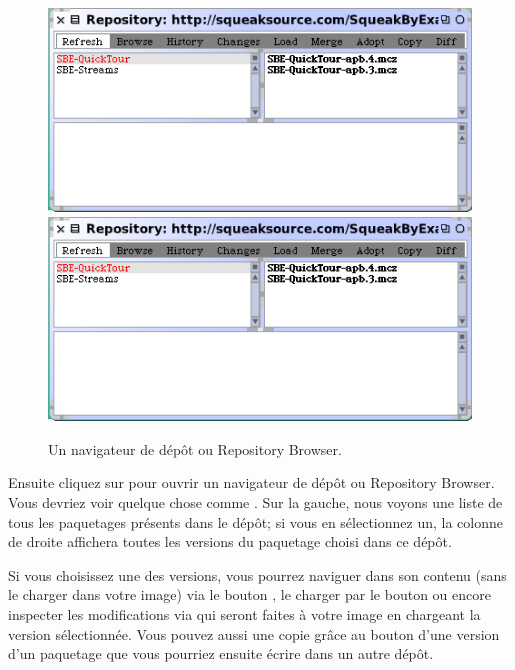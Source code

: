 \documentclass[a4paper,10pt,twoside]{book}
\begin{document}
\begin{figure}[btp]
	\begin{center}
	\ifluluelse
		{\includegraphics[width=\textwidth]{SqueakSource-SBE}}
		{\includegraphics[scale=0.7]{SqueakSource-SBE}}
	\end{center}
	\caption{Un navigateur de d\'ep\^ot ou Repository Browser.}
	\label{fig:SqueakSource:SBE}
\end{figure}
\noindent

Ensuite cliquez sur  pour ouvrir un navigateur de d\'ep\^ot ou
Repository Browser. Vous devriez voir quelque chose comme
 .  
Sur la gauche, nous voyons une liste de tous les paquetages pr\'esents dans le
d\'ep\^ot; si vous en s\'electionnez un, la colonne de droite affichera
toutes les versions du paquetage choisi dans ce d\'ep\^ot.

Si vous choisissez une des versions, vous pourrez naviguer dans son contenu (sans le charger dans votre image) via le bouton , le charger
par le bouton  ou encore inspecter les modifications
via  qui seront faites \`a votre image en chargeant la version
s\'electionn\'ee. Vous pouvez aussi une copie gr\^ace au bouton 
d'une version d'un paquetage que vous pourriez ensuite \'ecrire dans un
autre d\'ep\^ot.
\end{document}
